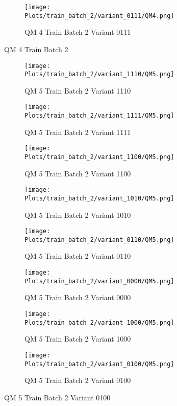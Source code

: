 \documentclass{DissertateFigs}
\begin{document}
\begin{figure}[t!]
\medskip

    \begin{subfigure}{0.47\textwidth}
    \texttt{[image: Plots/train\_batch\_2/variant\_0111/QM4.png]}
    \caption{QM 4 Train Batch 2 Variant 0111}
    \end{subfigure}
\caption{QM 4 Train Batch 2}
    \end{figure}
\clearpage
\begin{figure}[t!]
    \begin{subfigure}{0.47\textwidth}
    \texttt{[image: Plots/train\_batch\_2/variant\_1110/QM5.png]}
    \caption{QM 5 Train Batch 2 Variant 1110}
    \end{subfigure}
    \begin{subfigure}{0.47\textwidth}
    \texttt{[image: Plots/train\_batch\_2/variant\_1111/QM5.png]}
    \caption{QM 5 Train Batch 2 Variant 1111}
    \end{subfigure}

\medskip

    \begin{subfigure}{0.47\textwidth}
    \texttt{[image: Plots/train\_batch\_2/variant\_1100/QM5.png]}
    \caption{QM 5 Train Batch 2 Variant 1100}
    \end{subfigure}
    \begin{subfigure}{0.47\textwidth}
    \texttt{[image: Plots/train\_batch\_2/variant\_1010/QM5.png]}
    \caption{QM 5 Train Batch 2 Variant 1010}
    \end{subfigure}

\medskip

    \begin{subfigure}{0.47\textwidth}
    \texttt{[image: Plots/train\_batch\_2/variant\_0110/QM5.png]}
    \caption{QM 5 Train Batch 2 Variant 0110}
    \end{subfigure}
    \begin{subfigure}{0.47\textwidth}
    \texttt{[image: Plots/train\_batch\_2/variant\_0000/QM5.png]}
    \caption{QM 5 Train Batch 2 Variant 0000}
    \end{subfigure}

\medskip

    \begin{subfigure}{0.47\textwidth}
    \texttt{[image: Plots/train\_batch\_2/variant\_1000/QM5.png]}
    \caption{QM 5 Train Batch 2 Variant 1000}
    \end{subfigure}
    \begin{subfigure}{0.47\textwidth}
    \texttt{[image: Plots/train\_batch\_2/variant\_0100/QM5.png]}
    \caption{QM 5 Train Batch 2 Variant 0100}
    \end{subfigure}


\end{figure}
\end{document}
